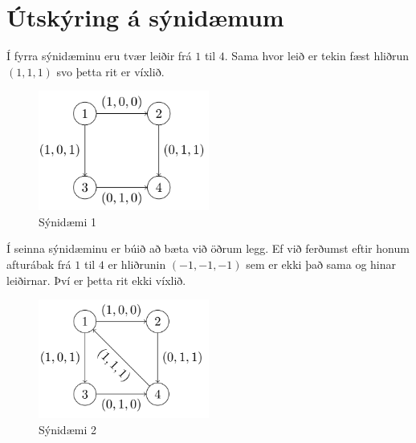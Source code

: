 \section*{Útskýring á sýnidæmum}
Í fyrra sýnidæminu eru tvær leiðir frá $1$ til $4$. Sama hvor leið er tekin fæst hliðrun $(1,1,1)$ svo þetta rit er víxlið. \\

\begin{figure}[h!]
  \centering
    \includegraphics[width=0.5\textwidth]{sample1}
  \caption{Sýnidæmi 1}
\end{figure}

Í seinna sýnidæminu er búið að bæta við öðrum legg. Ef við ferðumst eftir honum afturábak frá $1$ til $4$ er hliðrunin $(-1,-1,-1)$ sem er ekki það sama og hinar leiðirnar. Því er þetta rit ekki víxlið. \\

\begin{figure}[h!]
  \centering
    \includegraphics[width=0.5\textwidth]{sample2}
  \caption{Sýnidæmi 2}
\end{figure}
